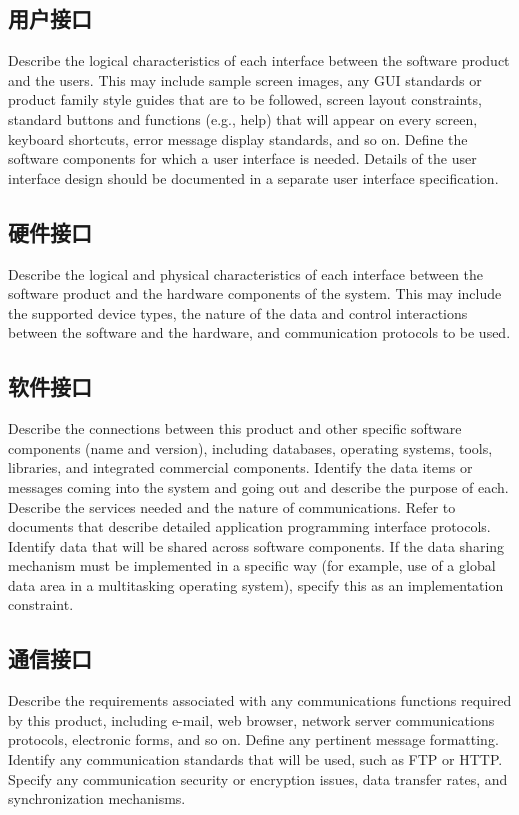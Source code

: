 \documentclass{ctexart}
\begin{document}
\subsection{用户接口}
Describe the logical characteristics of each interface between the software 
product and the users. This may include sample screen images, any GUI standards 
or product family style guides that are to be followed, screen layout 
constraints, standard buttons and functions (e.g., help) that will appear on 
every screen, keyboard shortcuts, error message display standards, and so on.  
Define the software components for which a user interface is needed. Details of 
the user interface design should be documented in a separate user interface 
specification.


\subsection{硬件接口}
Describe the logical and physical characteristics of each interface between 
the software product and the hardware components of the system. This may include 
the supported device types, the nature of the data and control interactions 
between the software and the hardware, and communication protocols to be 
used.


\subsection{软件接口}
Describe the connections between this product and other specific software 
components (name and version), including databases, operating systems, tools, 
libraries, and integrated commercial components. Identify the data items or 
messages coming into the system and going out and describe the purpose of each.  
Describe the services needed and the nature of communications. Refer to 
documents that describe detailed application programming interface protocols.  
Identify data that will be shared across software components. If the data 
sharing mechanism must be implemented in a specific way (for example, use of a 
global data area in a multitasking operating system), specify this as an 
implementation constraint.


\subsection{通信接口}
Describe the requirements associated with any communications functions 
required by this product, including e-mail, web browser, network server 
communications protocols, electronic forms, and so on. Define any pertinent 
message formatting. Identify any communication standards that will be used, such 
as FTP or HTTP. Specify any communication security or encryption issues, data 
transfer rates, and synchronization mechanisms.
\end{document}

